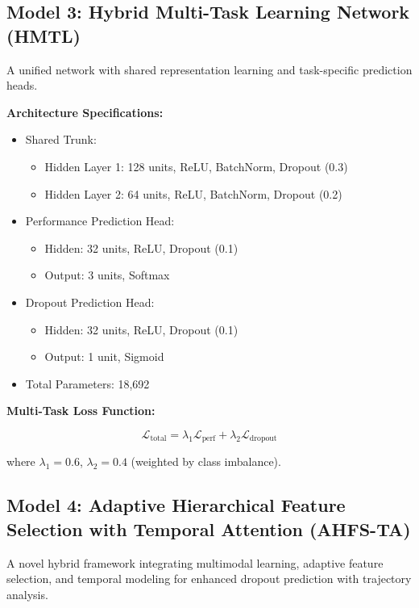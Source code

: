 \subsection{Model 3: Hybrid Multi-Task Learning Network (HMTL)}

A unified network with shared representation learning and task-specific prediction heads.

\textbf{Architecture Specifications:}
\begin{itemize}
\item Shared Trunk:
\begin{itemize}
\item Hidden Layer 1: 128 units, ReLU, BatchNorm, Dropout (0.3)
\item Hidden Layer 2: 64 units, ReLU, BatchNorm, Dropout (0.2)
\end{itemize}
\item Performance Prediction Head:
\begin{itemize}
\item Hidden: 32 units, ReLU, Dropout (0.1)
\item Output: 3 units, Softmax
\end{itemize}
\item Dropout Prediction Head:
\begin{itemize}
\item Hidden: 32 units, ReLU, Dropout (0.1)
\item Output: 1 unit, Sigmoid
\end{itemize}
\item Total Parameters: 18,692
\end{itemize}

\textbf{Multi-Task Loss Function:}

\begin{equation}
\mathcal{L}_{\text{total}} = \lambda_1 \mathcal{L}_{\text{perf}} + \lambda_2 \mathcal{L}_{\text{dropout}}
\end{equation}

where $\lambda_1 = 0.6$, $\lambda_2 = 0.4$ (weighted by class imbalance).

\subsection{Model 4: Adaptive Hierarchical Feature Selection with Temporal Attention (AHFS-TA)}

A novel hybrid framework integrating multimodal learning, adaptive feature selection, and temporal modeling for enhanced dropout prediction with trajectory analysis.

